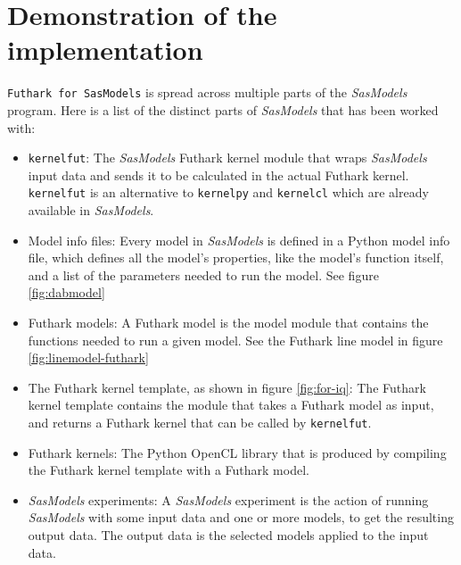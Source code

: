 \documentclass[11pt]{article}
\newcommand{\sasmodels}{\textit{SasModels}}
\newcommand{\futhark}{\texttt{Futhark for SasModels}}
\begin{document}
\section{Demonstration of the implementation}
\begin{mdframed}[
  frametitle={Terminology:},
  nobreak=true
  ]
  \futhark{} is spread across multiple parts
  of the \sasmodels{} program. Here is a list of the distinct parts of 
  \sasmodels{} that has been worked with:
  \begin{itemize}
    \item \texttt{kernelfut}: The \sasmodels{} Futhark kernel module that wraps 
    \sasmodels{} input data and sends it to be calculated in the actual Futhark 
    kernel. \texttt{kernelfut} is an alternative to \texttt{kernelpy} and
    \texttt{kernelcl} which are already available in \sasmodels.

    \item Model info files: Every model in \sasmodels{} is defined in a Python 
    model info file, which defines all the model's properties, like the model's
    function itself, and a list of the parameters needed to run the model.
    See figure \ref{fig:dabmodel}

    \item Futhark models: A Futhark model is the model module that contains the
    functions needed to run a given model. See the Futhark line model in figure 
    \ref{fig:linemodel-futhark}
    
    \item The Futhark kernel template, as shown in figure \ref{fig:for-iq}:
    The Futhark kernel template contains the module that takes a Futhark
    model as input, and returns a Futhark kernel that can be called by 
    \texttt{kernelfut}.
    
    \item Futhark kernels: The Python OpenCL library that is produced by 
    compiling the Futhark kernel template with a Futhark model.

    \item \sasmodels{} experiments: A \sasmodels{} experiment is the action of 
    running \sasmodels{} with some input data and one or more models, to get 
    the resulting output data. The output data is the selected models applied
    to the input data.
  \end{itemize}
  
\end{mdframed}
\end{document}
